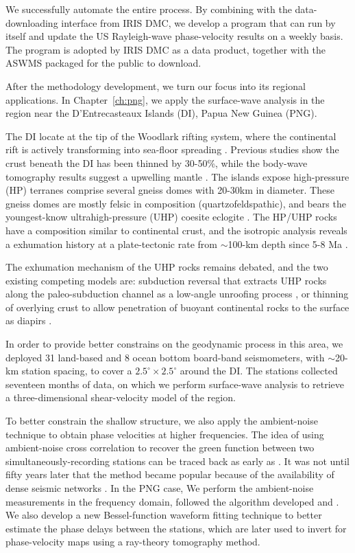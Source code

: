 \documentclass[12pt,oneside]{book}
\begin{document}
We successfully automate the entire process. By combining with the data-downloading interface from IRIS DMC, we develop a program that can run by itself and update the US Rayleigh-wave phase-velocity results on a weekly basis. The program is adopted by IRIS DMC as a data product, together with the ASWMS packaged for the public to download. 

After the methodology development, we turn our focus into its regional applications. In Chapter~\ref{ch:png}, we apply the surface-wave analysis in the region near the D'Entrecasteaux Islands (DI), Papua New Guinea (PNG).

The DI locate at the tip of the Woodlark rifting system, where the continental rift is actively transforming into sea-floor spreading \citep[e.g.][]{Taylor:1999ur, Ferris:2006tr}. Previous studies show the crust beneath the DI has been thinned by 30-50\%, while the body-wave tomography results suggest a upwelling mantle \citep{Abers:2002uj, Ferris:2006tr}.
The islands expose high-pressure (HP) terranes comprise several gneiss domes with 20-30km in diameter. These gneiss domes are mostly felsic in composition (quartzofeldspathic), and bears the youngest-know ultrahigh-pressure (UHP) coesite eclogite \citep{Baldwin:2004wx, Baldwin:2008gm, Little:2011jy}. The HP/UHP rocks have a composition similar to continental crust, and the isotropic analysis reveals a exhumation history at a plate-tectonic rate from $\sim$100-km depth since 5-8 Ma \citep{Baldwin:2008gm, Gordon:2012hu}.

The exhumation mechanism of the UHP rocks remains debated, and the two existing competing models are: subduction reversal that extracts UHP rocks along the paleo-subduction channel as a low-angle unroofing process \citep{Hill:1992jd, Webb:2008fc}, or thinning of overlying crust to allow penetration of buoyant continental rocks to the surface as diapirs \citep{Ellis:2011jh, Little:2011jy}.

In order to provide better constrains on the geodynamic process in this area, we deployed 31 land-based and 8 ocean bottom board-band seismometers, with $\sim$20-km station spacing, to cover a $2.5^\circ \times 2.5^\circ$ around the DI. The stations collected seventeen months of data, on which we perform surface-wave analysis to retrieve a three-dimensional shear-velocity model of the region.

To better constrain the shallow structure, we also apply the ambient-noise technique to obtain phase velocities at higher frequencies.
The idea of using ambient-noise cross correlation to recover the green function between two simultaneously-recording stations can be traced back as early as \citet{Aki:1957un}. 
It was not until fifty years later that the method became popular because of the availability of dense seismic networks \citep[e.g.][]{Shapiro:2005kz,Bensen:2007hl}. 
In the PNG case, We perform the ambient-noise measurements in the frequency domain, followed the algorithm developed \citet{Ekstrom:2009iv} and \citet{Ekstrom:2013dr}. 
We also develop a new Bessel-function waveform fitting technique to better estimate the phase delays between the stations, which are later used to invert for phase-velocity maps using a ray-theory tomography method.
\end{document}

